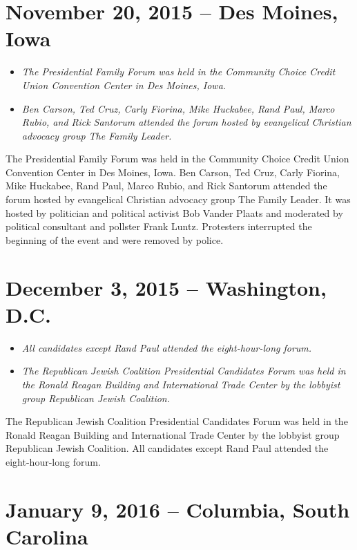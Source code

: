 \section{November 20, 2015 -- Des Moines,
Iowa}\label{november-20-2015-des-moines-iowa}

\begin{itemize}
\item
  \emph{The Presidential Family Forum was held in the Community Choice
  Credit Union Convention Center in Des Moines, Iowa.}
\item
  \emph{Ben Carson, Ted Cruz, Carly Fiorina, Mike Huckabee, Rand Paul,
  Marco Rubio, and Rick Santorum attended the forum hosted by
  evangelical Christian advocacy group The Family Leader.}
\end{itemize}

The Presidential Family Forum was held in the Community Choice Credit
Union Convention Center in Des Moines, Iowa. Ben Carson, Ted Cruz, Carly
Fiorina, Mike Huckabee, Rand Paul, Marco Rubio, and Rick Santorum
attended the forum hosted by evangelical Christian advocacy group The
Family Leader. It was hosted by politician and political activist Bob
Vander Plaats and moderated by political consultant and pollster Frank
Luntz. Protesters interrupted the beginning of the event and were
removed by police.

\section{December 3, 2015 -- Washington,
D.C.}\label{december-3-2015-washington-d.c.}

\begin{itemize}
\item
  \emph{All candidates except Rand Paul attended the eight-hour-long
  forum.}
\item
  \emph{The Republican Jewish Coalition Presidential Candidates Forum
  was held in the Ronald Reagan Building and International Trade Center
  by the lobbyist group Republican Jewish Coalition.}
\end{itemize}

The Republican Jewish Coalition Presidential Candidates Forum was held
in the Ronald Reagan Building and International Trade Center by the
lobbyist group Republican Jewish Coalition. All candidates except Rand
Paul attended the eight-hour-long forum.

\section{January 9, 2016 -- Columbia, South
Carolina}\label{january-9-2016-columbia-south-carolina}

